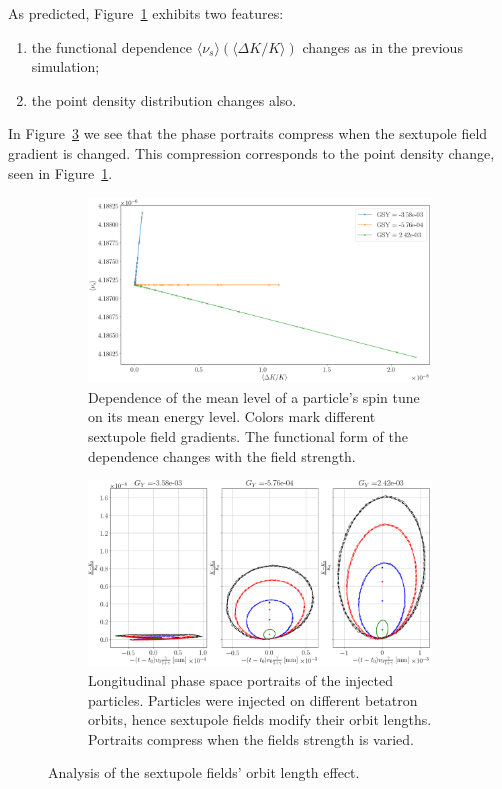 \documentclass[]{elsarticle}
\newcommand{\D}{\Delta}
\newcommand{\avg}[1]{\langle{#1}\rangle}
\begin{document}
As predicted, Figure~\ref{fig:sext:OL_effect} exhibits two features:
\begin{enumerate}[(1)]
\item the functional dependence $\avg{\nu_s}(\avg{\D K/K})$ changes as in the previous simulation;
\item the point density distribution changes also.
\end{enumerate}

In Figure~\ref{fig:sext:OL_effect:LPS} we see that the phase portraits compress when the sextupole field gradient
is changed. This compression corresponds to the point density change, seen in Figure~\ref{fig:sext:OL_effect}.
\begin{figure}[h]\centering
  \begin{subfigure}{\linewidth}
    \includegraphics[width=\linewidth]{img/decoh/STDK_3SS_Y}
    \caption{Dependence of the mean level of a particle's spin tune on its mean energy level.
      Colors mark different sextupole field gradients.
      The functional form of the dependence changes with the field strength.\label{fig:sext:OL_effect}}
  \end{subfigure}
  \begin{subfigure}{\linewidth}
    \includegraphics[width=\linewidth]{img/decoh/LPS_3SS_Y}
    \caption{Longitudinal phase space portraits of the injected particles.
      Particles were injected on different betatron orbits, hence sextupole fields modify their orbit lengths.
      Portraits compress when the fields strength is varied.\label{fig:sext:OL_effect:LPS}}
  \end{subfigure}
  \caption{Analysis of the sextupole fields' orbit length effect.}
\end{figure}
\end{document}
